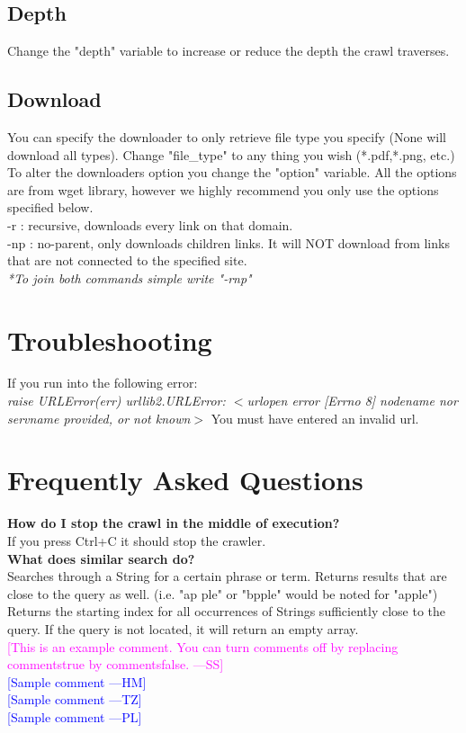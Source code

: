 \documentclass[12pt, titlepage]{article}
\newcommand{\authornote}[3]{\textcolor{#1}{[#3 ---#2]}}
\newcommand{\authornote}[3]{}
\newcommand{\wss}[1]{\authornote{magenta}{SS}{#1}}
\newcommand{\hm}[1]{\authornote{blue}{HM}{#1}} %
\newcommand{\tz}[1]{\authornote{blue}{TZ}{#1}} %
\newcommand{\pl}[1]{\authornote{blue}{PL}{#1}} %
\begin{document}
\subsection{Depth} 
Change the "depth" variable to increase or reduce the depth the crawl traverses.

\subsection{Download} 
You can specify the downloader to only retrieve file type you specify (None will download all types). Change "file\_type" to any thing you wish (*.pdf,*.png, etc.)\\
To alter the downloaders option you change the "option" variable. All the options are from wget library, however we highly recommend you only use the options specified below.\\
-r : recursive, downloads every link on that domain.\\
-np : no-parent, only downloads children links. It will NOT download from links that are not connected to the specified site.\\
\textit{*To join both commands simple write "-rnp"}

\pagebreak
\section{Troubleshooting}
If you run into the following error:\\
\textit{ raise URLError(err)
urllib2.URLError: ${<}$urlopen error [Errno 8] nodename nor servname provided, or not known${>}$}
You must have entered an invalid url.

\pagebreak
\section{Frequently Asked Questions}
\textbf{How do I stop the crawl in the middle of execution?}\\
If you press Ctrl+C it should stop the crawler.\\

\textbf{What does similar search do?}\\
 Searches through a String for a certain phrase or term. Returns results that are close to the query as well.
        (i.e. "ap ple" or "bpple" would be noted for "apple") Returns the starting index for all occurrences of Strings sufficiently close to
        the query. If the query is not located, it will return an empty array.\\


\noindent \wss{This is an example comment.  You can turn comments off by replacing
  commentstrue by commentsfalse.}\\
\hm{Sample comment}\\
\tz{Sample comment}\\
\pl{Sample comment}
\end{document}

